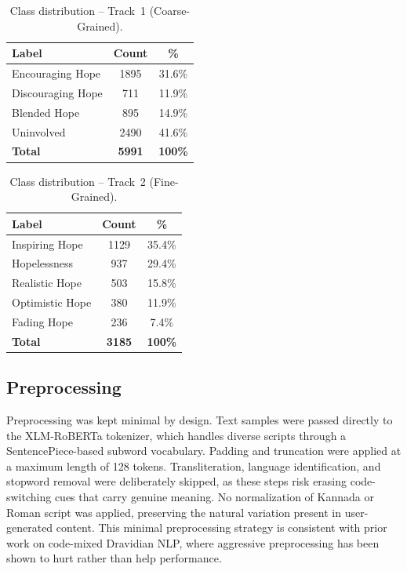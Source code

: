 \documentclass[11pt]{article}
\begin{document}
\begin{table}[H]
\centering\small
\setlength{\tabcolsep}{5pt}\renewcommand{\arraystretch}{1.1}
\begin{tabular}{lcc}
\toprule
\rowcolor{headerblue}\textbf{Label} & \textbf{Count} & \textbf{\%} \\
\midrule
Encouraging Hope  & 1895 & 31.6\% \\
Discouraging Hope & 711  & 11.9\% \\
Blended Hope      & 895  & 14.9\% \\
Uninvolved        & 2490 & 41.6\% \\
\midrule
\textbf{Total} & \textbf{5991} & \textbf{100\%} \\
\bottomrule
\end{tabular}
\caption{Class distribution -- Track~1 (Coarse-Grained).}
\label{tab:track1}
\end{table}

\begin{table}[H]
\centering\small
\setlength{\tabcolsep}{4pt}\renewcommand{\arraystretch}{1.1}
\begin{tabular}{lcc}
\toprule
\rowcolor{headerblue}\textbf{Label} & \textbf{Count} & \textbf{\%} \\
\midrule
Inspiring Hope  & 1129 & 35.4\% \\
Hopelessness    & 937  & 29.4\% \\
Realistic Hope  & 503  & 15.8\% \\
Optimistic Hope & 380  & 11.9\% \\
Fading Hope     & 236  &  7.4\% \\
\midrule
\textbf{Total} & \textbf{3185} & \textbf{100\%} \\
\bottomrule
\end{tabular}
\caption{Class distribution -- Track~2 (Fine-Grained).}
\label{tab:track2}
\end{table}

\subsection{Preprocessing}
Preprocessing was kept minimal by design. Text samples were passed directly to the
XLM-RoBERTa tokenizer, which handles diverse scripts through a SentencePiece-based
subword vocabulary. Padding and truncation were applied at a maximum length of 128
tokens. Transliteration, language identification, and stopword removal were
deliberately skipped, as these steps risk erasing code-switching cues that carry
genuine meaning. No normalization of Kannada or Roman script was applied, preserving
the natural variation present in user-generated content. This minimal preprocessing
strategy is consistent with prior work on code-mixed Dravidian NLP, where aggressive
preprocessing has been shown to hurt rather than help performance.
\end{document}
